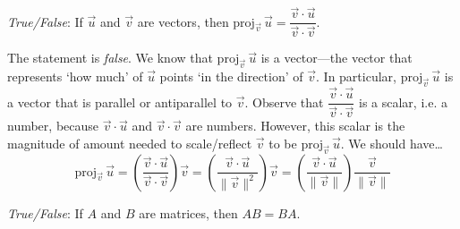 \documentclass[11pt,letterpaper]{article}
\begin{document}
\quizsol \textit{True/False}: If $\vec{u}$ and $\vec{v}$ are vectors, then $\text{proj}_{\vec{v}}\, \vec{u}= \dfrac{\vec{v} \cdot \vec{u}}{\vec{v} \cdot \vec{v}}$. \pspace

\sol The statement is \textit{false}. We know that $\text{proj}_{\vec{v}}\, \vec{u}$ is a vector---the vector that represents `how much' of $\vec{u}$ points `in the direction' of $\vec{v}$. In particular, $\text{proj}_{\vec{v}}\, \vec{u}$ is a vector that is parallel or antiparallel to $\vec{v}$. Observe that $\dfrac{\vec{v} \cdot \vec{u}}{\vec{v} \cdot \vec{v}}$ is a scalar, i.e. a number, because $\vec{v} \cdot \vec{u}$ and $\vec{v} \cdot \vec{v}$ are numbers. However, this scalar is the magnitude of amount needed to scale/reflect $\vec{v}$ to be $\text{proj}_{\vec{v}}\, \vec{u}$. We should have\dots
	\[
	\text{proj}_{\vec{v}}\, \vec{u}= \left( \dfrac{\vec{v} \cdot \vec{u}}{\vec{v} \cdot \vec{v}} \right) \vec{v}=  \left( \dfrac{\vec{v} \cdot \vec{u}}{\| \vec{v} \|^2} \right) \vec{v}= \left( \dfrac{\vec{v} \cdot \vec{u}}{\| \vec{v} \|} \right) \dfrac{\vec{v}}{\|\vec{v}\|}
	\] \pvspace{0.8cm}



\quizsol \textit{True/False}: If $A$ and $B$ are matrices, then $AB= BA$. \pspace
\end{document}
